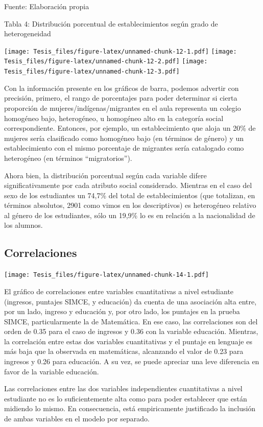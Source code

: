 \documentclass[
]{article}
\begin{document}
Fuente: Elaboración propia

Tabla 4: Distribución porcentual de establecimientos según grado de
heterogeneidad

\texttt{[image: Tesis\_files/figure-latex/unnamed-chunk-12-1.pdf]}
\texttt{[image: Tesis\_files/figure-latex/unnamed-chunk-12-2.pdf]}
\texttt{[image: Tesis\_files/figure-latex/unnamed-chunk-12-3.pdf]}

Con la información presente en los gráficos de barra, podemos advertir
con precisión, primero, el rango de porcentajes para poder determinar si
cierta proporción de mujeres/indígenas/migrantes en el aula representa
un colegio homogéneo bajo, heterogéneo, u homogéneo alto en la categoría
social correspondiente. Entonces, por ejemplo, un establecimiento que
aloja un 20\% de mujeres sería clasificado como homogéneo bajo (en
términos de género) y un establecimiento con el mismo porcentaje de
migrantes sería catalogado como heterogéneo (en términos
``migratorios'').

Ahora bien, la distribución porcentual según cada variable difere
significativamente por cada atributo social considerado. Mientras en el
caso del sexo de los estudiantes un 74,7\% del total de establecimientos
(que totalizan, en términos absolutos, 2901 como vimos en los
descriptivos) es heterogéneo relativo al género de los estudiantes, sólo
un 19,9\% lo es en relación a la nacionalidad de los alumnos.

\hypertarget{correlaciones}{%
\subsection{Correlaciones}\label{correlaciones}}

\texttt{[image: Tesis\_files/figure-latex/unnamed-chunk-14-1.pdf]}

El gráfico de correlaciones entre variables cuantitativas a nivel
estudiante (ingresos, puntajes SIMCE, y educación) da cuenta de una
asociación alta entre, por un lado, ingreso y educación y, por otro
lado, los puntajes en la prueba SIMCE, particularmente la de Matemática.
En ese caso, las correlaciones son del orden de 0.35 para el caso de
ingresos y 0.36 con la variable educación. Mientras, la correlación
entre estas dos variables cuantitativas y el puntaje en lenguaje es más
baja que la observada en matemáticas, alcanzando el valor de 0.23 para
ingresos y 0.26 para educación. A su vez, se puede apreciar una leve
diferencia en favor de la variable educación.

Las correlaciones entre las dos variables independientes cuantitativas a
nivel estudiante no es lo suficientemente alta como para poder
establecer que están midiendo lo mismo. En consecuencia, está
empiricamente justificado la inclusión de ambas variables en el modelo
por separado.
\end{document}
